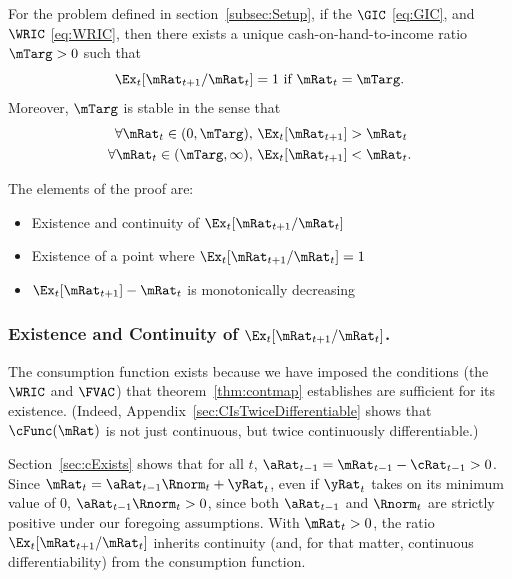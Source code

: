 \documentclass[BufferStockTheory]{subfiles}
\begin{document}
\begin{theorem}
  \label{thm:target} For the problem defined in section~\ref{subsec:Setup}, 
  if the $\GIC$ \eqref{eq:GIC}, and $\WRIC$ \eqref{eq:WRIC}, 
 then there exists a unique cash-on-hand-to-income ratio $\mTarg>0$ such that
  \begin{equation}  
    \Ex_t [{\mRat}_{t+1}/\mRat_t] = 1 \mbox{~if~} \mRat_t = \mTarg. 
    \label{eq:mTarget}
  \end{equation}
  Moreover, $\mTarg$ is stable in the sense that
  \begin{align}\label{eq:stability}
    \forall {\mRat}_t\in(0,\mTarg),      \,\,& \Ex_t [{\mRat}_{t+1}] > {\mRat}_t  \\
    \forall {\mRat}_t\in(\mTarg,\infty), \,\,& \Ex_t [{\mRat}_{t+1}] < {\mRat}_t. \notag
  \end{align}

\end{theorem}

The elements of the proof are:
\begin{itemize}
\item Existence and continuity of $\Ex_t [{\mRat}_{t+1}/\mRat_t]$
\item Existence of a point where $\Ex_t [{\mRat}_{t+1}/\mRat_t] = 1$
\item $\Ex_t [{\mRat}_{t+1}]-\mRat_{t}$ is monotonically decreasing
\end{itemize}

\subsubsection{Existence and Continuity of $\Ex_t [{\mRat}_{t+1}/\mRat_t]$.}
The consumption function exists because we have imposed the conditions (the $\WRIC$ and $\FVAC$) that theorem~\ref{thm:contmap} establishes are sufficient for its existence.  (Indeed, Appendix~\ref{sec:CIsTwiceDifferentiable} shows that $\cFunc(\mRat)$ is not just continuous, but twice continuously differentiable.)

Section~\ref{sec:cExists} shows that for all $t$, $\aRat_{t-1} = {\mRat}_{t-1} -  \cRat_{t-1} > 0$.  Since ${\mRat}_{t}= {\aRat}_{t-1} \Rnorm_{t} + \yRat_{t}$, even if $\yRat_{t}$ takes on its minimum value of 0, $\aRat_{t-1} \Rnorm_{t} > 0$, since both $\aRat_{t-1}$ and $\Rnorm_{t}$ are strictly positive under our foregoing assumptions.  With $\mRat_{t} > 0$, the ratio $\Ex_t [{\mRat}_{t+1}/\mRat_t]$ inherits continuity (and, for that matter, continuous differentiability) from the consumption function.
\end{document}
